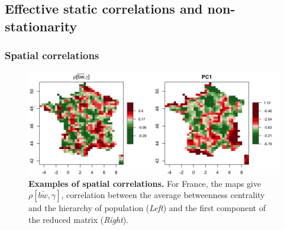 \documentclass[11pt]{article}
\begin{document}
\subsection{Effective static correlations and non-stationarity}


\subsubsection{Spatial correlations}


\begin{figure}
\includegraphics[width=\linewidth]{figures/4-1-3-fig-staticcorrs-mapscorrs}
\caption{\textbf{Examples of spatial correlations.} For France, the maps give $\rho\left[\bar{bw},\gamma\right]$, correlation between the average betweenness centrality and the hierarchy of population (\textit{Left}) and the first component of the reduced matrix (\textit{Right}).\label{fig:staticcorrs:mapscorrs}}
\end{figure}
\end{document}

